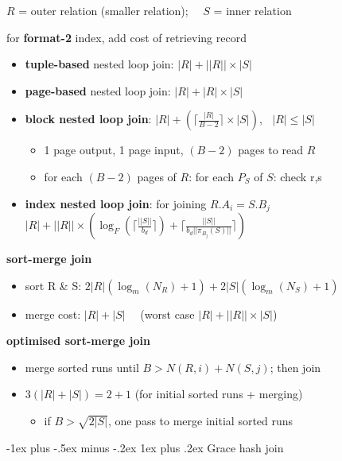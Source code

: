 \documentclass[10pt, landscape]{article}
\makeatletter
\renewcommand{\subsubsection}{\@startsection{subsubsection}{3}{0mm}%
  {-1ex plus -.5ex minus -.2ex}%
  {1ex plus .2ex}%
{\normalfont\small\bfseries}}%
\makeatother
\begin{document}
\begin{multicols*}{4}
  $R$ = outer relation (smaller relation); $\quad S$ = inner relation

  \attention for \textbf{format-2} index, add cost of retrieving record

  \begin{itemize}
    \item \textbf{tuple-based} nested loop join: $|R| + ||R|| \times |S|$
    \item \textbf{page-based} nested loop join: $|R| + |R| \times |S|$
    \item \textbf{block nested loop join}: $|R| + ( \lceil \frac{|R|}{B-2} \rceil \times |S| )$, $\;\; |R|\leq|S|$
          \begin{itemize}
            \item 1 page output, 1 page input, $(B-2)$ pages to read $R$
            \item for each $(B-2)$ pages of $R$: for each $P_S$ of $S$: check r,s
          \end{itemize}
    \item \textbf{index nested loop join}: for joining $R.A_i = S.B_j$
          $|R| + ||R|| \times \left( \log_F(\lceil \frac{||S||}{b_d} \rceil ) + \lceil \frac{||S||}{b_d ||\pi_{B_j}(S)||} \rceil \right)$
  \end{itemize}

  \textbf{sort-merge join}

  \begin{itemize}
    \item sort R \& S: $2|R| (\log_m(N_R)+1) + 2|S| (\log_m(N_S)+1)$
    \item merge cost: $|R| + |S| \quad$ (worst case $|R| + ||R||\times|S|$)
  \end{itemize}

  \textbf{optimised sort-merge join}

  \begin{itemize}
    \item merge sorted runs until $B > N(R, i) + N(S, j)$; then join
    \item $3(|R|+|S|) = 2+1$ (for initial sorted runs + merging)
          \begin{itemize}
            \item if $B > \sqrt{2|S|}$, one pass to merge initial sorted runs
          \end{itemize}
  \end{itemize}

  \subsubsection{Grace hash join}


\end{multicols*}
\end{document}
